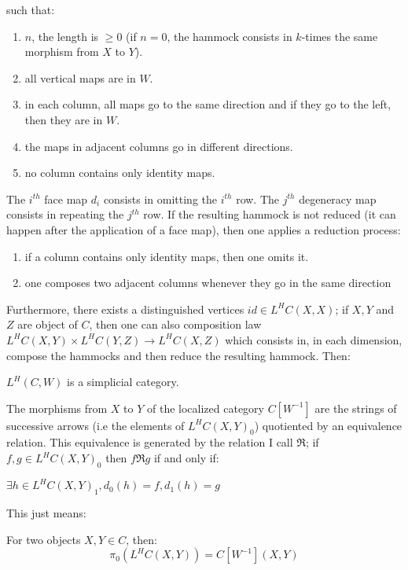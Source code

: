 \begin{refsection}
such that:
\begin{enumerate}
\item $n$, the length is $\geq 0$ (if $n=0$, the hammock consists in $k$-times the same morphism from $X$ to $Y$).
\item all vertical maps are in $W$.
\item in each column, all maps go to the same direction and if they go to the left, then they are in $W$.
\item the maps in adjacent columns go in different directions.
\item no column contains only identity maps.
\end{enumerate}

The $i^{th}$ face map $d_i$ consists in omitting the $i^{th}$ row. The $j^{th}$ degeneracy map consists in repeating the $j^{th}$ row. If the resulting hammock is not reduced (it can happen after the application of a face map), then one applies a reduction process:
\begin{enumerate}
\item if a column contains only identity maps, then one omits it.
\item one composes two adjacent columns whenever they go in the same direction
\end{enumerate}

Furthermore, there exists a distinguished vertices $id \in L^HC(X,X)$; if $X,Y$ and $Z$ are object of $C$, then one can also composition law $L^HC(X,Y) \times L^HC(Y,Z) \rightarrow L^H C(X,Z)$ which consists in, in each dimension, compose the hammocks and then reduce the resulting hammock. Then:

\begin{prop}
$L^H (C,W)$ is a simplicial category.
\end{prop}

The morphisms from $X$ to $Y$ of the localized category $C[W^{-1}]$ are the strings of successive arrows (i.e the elements of $L^HC(X,Y)_0$) quotiented by an equivalence relation. This equivalence is generated by the relation I call $\Re$; if $f,g \in L^HC(X,Y)_0$ then $ f \Re g$ if and only if:

\begin{center}
$\exists h \in L^H C(X,Y)_1 , d_0 (h)=f , d_1 (h)=g$
\end{center}

This just means:

\begin{prop}
For two objects $X,Y \in C$, then:
\begin{equation}
\pi_0 (L^H C(X,Y))=C[W^{-1}](X,Y)
\end{equation}
\end{prop}


\end{refsection}

